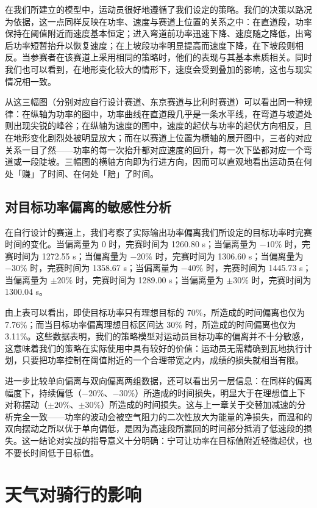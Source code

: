 \documentclass[11pt,a4paper]{ctexart}
\begin{document}
在我们所建立的模型中，运动员很好地遵循了我们设定的策略。我们的决策以路况为依据，这一点同样反映在功率、速度与赛道上位置的关系之中：在直道段，功率保持在阈值附近而速度基本恒定；进入弯道前功率迅速下降、速度随之降低，出弯后功率短暂抬升以恢复速度；在上坡段功率明显提高而速度下降，在下坡段则相反。当参赛者在该赛道上采用相同的策略时，他们的表现与其基本素质相关。同时我们也可以看到，在地形变化较大的情形下，速度会受到叠加的影响，这也与现实情况相一致。

从这三幅图（分别对应自行设计赛道、东京赛道与比利时赛道）可以看出同一种规律：在纵轴为功率的图中，功率曲线在直道段几乎是一条水平线，在弯道与坡道处则出现尖锐的峰谷；在纵轴为速度的图中，速度的起伏与功率的起伏方向相反，且在地形变化剧烈处被明显放大；而在以赛道上位置为横轴的展开图中，三者的对应关系一目了然——功率的每一次抬升都对应速度的回升，每一次下坠都对应一个弯道或一段陡坡。三幅图的横轴方向即为行进方向，因而可以直观地看出运动员在何处「赚」了时间、在何处「赔」了时间。

\subsection{对目标功率偏离的敏感性分析}

在自行设计的赛道上，我们考察了实际输出功率偏离我们所设定的目标功率时完赛时间的变化。当偏离量为 0 时，完赛时间为 1260.80 s；当偏离量为 $-10\%$ 时，完赛时间为 1272.55 s；当偏离量为 $-20\%$ 时，完赛时间为 1306.60 s；当偏离量为 $-30\%$ 时，完赛时间为 1358.67 s；当偏离量为 $-40\%$ 时，完赛时间为 1445.73 s；当偏离量为 $\pm 20\%$ 时，完赛时间为 1289.00 s；当偏离量为 $\pm 30\%$ 时，完赛时间为 1300.04 s。

由上表可以看出，即使目标功率只有理想目标的 70\%，所造成的时间偏离也仅为 7.76\%；而当目标功率偏离理想目标区间达 30\% 时，所造成的时间偏离也仅为 3.11\%。这些数据表明，我们的策略模型对运动员目标功率的偏离并不十分敏感，这意味着我们的策略在实际使用中具有较好的价值：运动员无需精确到瓦地执行计划，只要把功率控制在阈值附近的一个合理带宽之内，成绩的损失就相当有限。

进一步比较单向偏离与双向偏离两组数据，还可以看出另一层信息：在同样的偏离幅度下，持续偏低（$-20\%$、$-30\%$）所造成的时间损失，明显大于在理想值上下对称摆动（$\pm 20\%$、$\pm 30\%$）所造成的时间损失。这与上一章关于交替加减速的分析完全一致——功率的波动会被空气阻力的二次性放大为能量的净损失，而温和的双向摆动之所以优于单向偏低，是因为高速段所赢回的时间部分抵消了低速段的损失。这一结论对实战的指导意义十分明确：宁可让功率在目标值附近轻微起伏，也不要长时间低于目标值。

\section{天气对骑行的影响}
\end{document}
